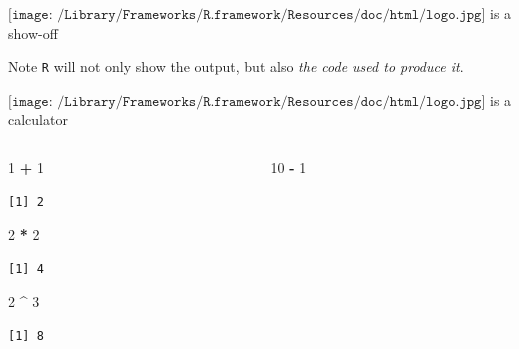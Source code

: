 \documentclass[
  11pt,
  ignorenonframetext,
]{beamer}
\newenvironment{Shaded}{\begin{snugshade}}{\end{snugshade}}
\newcommand{\DecValTok}[1]{\textcolor[rgb]{0.00,0.00,0.81}{#1}}
\newcommand{\SpecialCharTok}[1]{\textcolor[rgb]{0.81,0.36,0.00}{\textbf{#1}}}
\begin{document}
\begin{frame}[fragile]{\(\texttt{[image: /Library/Frameworks/R.framework/Resources/doc/html/logo.jpg]}\)
is a show-off}
\begin{block}{Note}
\protect\hypertarget{note}{}
\texttt{R}{} will not only show the output, but also \emph{the code used
to produce it}.
\end{block}
\end{frame}

\begin{frame}[fragile]{\(\texttt{[image: /Library/Frameworks/R.framework/Resources/doc/html/logo.jpg]}\)
is a calculator}
\protect\hypertarget{includegraphicsheight1emlibraryframeworksr.frameworkresourcesdochtmllogo.jpg-is-a-calculator}{}
\begin{columns}[T,onlytextwidth]
\begin{column}{0.45\textwidth}
\begin{Shaded}
\begin{Highlighting}[]
\DecValTok{1} \SpecialCharTok{+} \DecValTok{1}
\end{Highlighting}
\end{Shaded}

\begin{verbatim}
[1] 2
\end{verbatim}

\begin{Shaded}
\begin{Highlighting}[]
\DecValTok{2} \SpecialCharTok{*} \DecValTok{2}
\end{Highlighting}
\end{Shaded}

\begin{verbatim}
[1] 4
\end{verbatim}

\begin{Shaded}
\begin{Highlighting}[]
\DecValTok{2} \SpecialCharTok{\^{}} \DecValTok{3}
\end{Highlighting}
\end{Shaded}

\begin{verbatim}
[1] 8
\end{verbatim}
\end{column}

\begin{column}{0.45\textwidth}
\begin{Shaded}
\begin{Highlighting}[]
\DecValTok{10} \SpecialCharTok{{-}} \DecValTok{1}
\end{Highlighting}
\end{Shaded}


\end{column}
\end{columns}
\end{frame}
\end{document}
